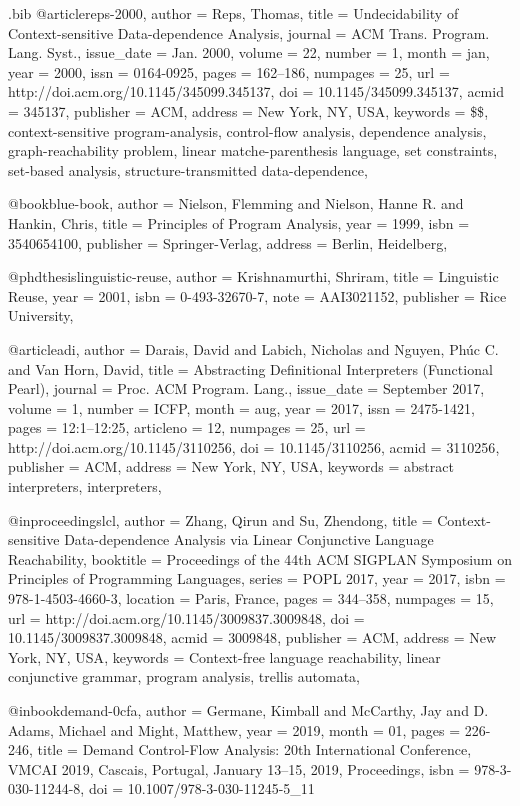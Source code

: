 \documentclass[12pt, oneside]{book}
\begin{document}
\begin{filecontents*}{\jobname.bib}
@article{reps-2000,
  author = {Reps, Thomas},
  title = {Undecidability of Context-sensitive Data-dependence Analysis},
  journal = {ACM Trans. Program. Lang. Syst.},
  issue_date = {Jan. 2000},
  volume = {22},
  number = {1},
  month = jan,
  year = {2000},
  issn = {0164-0925},
  pages = {162--186},
  numpages = {25},
  url = {http://doi.acm.org/10.1145/345099.345137},
  doi = {10.1145/345099.345137},
  acmid = {345137},
  publisher = {ACM},
  address = {New York, NY, USA},
  keywords = {{\$\infty\$}, context-sensitive program-analysis, control-flow analysis, dependence analysis, graph-reachability problem, linear matche-parenthesis language, set constraints, set-based analysis, structure-transmitted data-dependence},
} 

@book{blue-book,
  author = {Nielson, Flemming and Nielson, Hanne R. and Hankin, Chris},
  title = {Principles of Program Analysis},
  year = {1999},
  isbn = {3540654100},
  publisher = {Springer-Verlag},
  address = {Berlin, Heidelberg},
}

@phdthesis{linguistic-reuse,
  author = {Krishnamurthi, Shriram},
  title = {Linguistic Reuse},
  year = {2001},
  isbn = {0-493-32670-7},
  note = {AAI3021152},
  publisher = {Rice University},
}

@article{adi,
  author = {Darais, David and Labich, Nicholas and Nguyen, Ph\'{u}c C. and Van Horn, David},
  title = {Abstracting Definitional Interpreters (Functional Pearl)},
  journal = {Proc. ACM Program. Lang.},
  issue_date = {September 2017},
  volume = {1},
  number = {ICFP},
  month = aug,
  year = {2017},
  issn = {2475-1421},
  pages = {12:1--12:25},
  articleno = {12},
  numpages = {25},
  url = {http://doi.acm.org/10.1145/3110256},
  doi = {10.1145/3110256},
  acmid = {3110256},
  publisher = {ACM},
  address = {New York, NY, USA},
  keywords = {abstract interpreters, interpreters},
}

@inproceedings{lcl,
  author = {Zhang, Qirun and Su, Zhendong},
  title = {Context-sensitive Data-dependence Analysis via Linear Conjunctive Language Reachability},
  booktitle = {Proceedings of the 44th ACM SIGPLAN Symposium on Principles of Programming Languages},
  series = {POPL 2017},
  year = {2017},
  isbn = {978-1-4503-4660-3},
  location = {Paris, France},
  pages = {344--358},
  numpages = {15},
  url = {http://doi.acm.org/10.1145/3009837.3009848},
  doi = {10.1145/3009837.3009848},
  acmid = {3009848},
  publisher = {ACM},
  address = {New York, NY, USA},
  keywords = {Context-free language reachability, linear conjunctive grammar, program analysis, trellis automata},
}

@inbook{demand-0cfa,
  author = {Germane, Kimball and McCarthy, Jay and D. Adams, Michael and Might, Matthew},
  year = {2019},
  month = {01},
  pages = {226-246},
  title = {Demand Control-Flow Analysis: 20th International Conference, VMCAI 2019, Cascais, Portugal, January 13–15, 2019, Proceedings},
  isbn = {978-3-030-11244-8},
  doi = {10.1007/978-3-030-11245-5_11}
}
\end{filecontents*}


\end{document}

